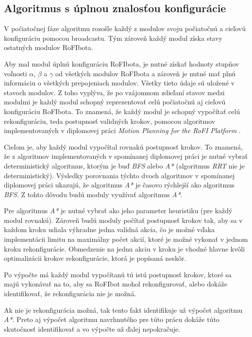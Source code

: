 \documentclass[
  printed, %
  oneside, %
  notable,   %
  nolof,     %
  nolot,     %
]{fithesis3}
\begin{document}
\subsection{Algoritmus s úplnou znalosťou konfigurácie}
\label{sec:motionPlanningAlgo}
V počiatočnej fáze algoritmu rozošle každý z modulov svoju počiatočnú a cieľovú konfiguráciu pomocou broadcastu. Tým zároveň každý modul získa stavy ostatných modulov RoFIbota. 

Aby mal modul úplnú konfiguráciu RoFIbota, je nutné získať hodnoty stupňov voľnosti $\alpha$, $\beta$ a $\gamma$ od všetkých modulov RoFIbota a zároveň je nutné mať plnú informáciu o všetkých prepojeniach modulov. Všetky tieto údaje sú uložené v stavoch modulov. Z toho vyplýva, že po vzájomnom zdieľaní stavov medzi modulmi je každý modul schopný reprezentovať celú počiatočnú aj cieľovú konfiguráciu RoFIbota. To znamená, že každý modul je schopný vypočítať celú rekonfiguráciu, teda postupnosť validných krokov, pomocou algoritmov implementovaných v diplomovej práci \textit{Motion Planning for the RoFI Platform} \cite{vozarovaMasterThesis}. 

Cieľom je, aby každý modul vypočítal rovnakú postupnosť krokov. To znamená, že z algoritmov implementovaných v spomínanej diplomovej práci je nutné vybrať deterministický algoritmus, ktorým je buď \textit{BFS} alebo \textit{A*} (algoritmus \textit{RRT} nie je deterministický). Výsledky porovnania týchto dvoch algoritmov v spomínanej diplomovej práci ukazujú, že algoritmus \textit{A*} je časovo rýchlejší ako algoritmus \textit{BFS}. Z tohto dôvodu budú moduly využívať algoritmus \textit{A*}. 

Pre algoritmus \textit{A*} je nutné vybrať ako jeho parameter heuristiku (pre každý modul rovnakú). Zároveň budú moduly počítať postupnosť krokov tak, aby sa v každom kroku udiala výhradne jedna validná akcia, čo je možné vďaka implementácii limitu na maximálny počet akcií, ktoré je možné vykonať v jednom kroku rekonfigurácie. Obmedzenie na jednu akciu v kroku je vhodné hlavne kvôli optimalizácii krokov rekonfigurácie, ktorá je popísaná neskôr. 

Po výpočte má každý modul vypočítanú tú istú postupnosť krokov, ktoré sa majú vykonávať na to, aby sa RoFIbot mohol rekonfigurovať, alebo dokáže identifikovať, že rekonfigurácia nie je možná. 

Ak nie je rekonfigurácia možná, tak tento fakt identifikuje už výpočet algoritmu \textit{A*}. Preto aj výpočet algoritmu navrhnutého pre túto prácu dokáže túto skutočnosť identifikovať a vo výpočte už ďalej nepokračuje. 
\end{document}

